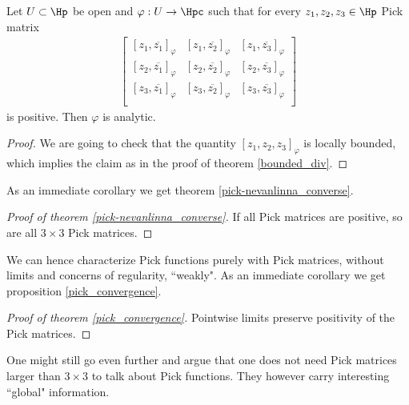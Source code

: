 \begin{lause}\label{Hindmarsh_theorem}
	Let $U \subset \Hp$ be open and $\varphi : U \to \Hpc$ such that for every $z_{1}, z_{2}, z_{3} \in \Hp$ Pick matrix
	\begin{align*}
	\begin{bmatrix}
		[z_{1}, \overline{z_{1}}]_{\varphi} & [z_{1}, \overline{z_{2}}]_{\varphi} & [z_{1}, \overline{z_{3}}]_{\varphi}\\
		[z_{2}, \overline{z_{1}}]_{\varphi} & [z_{2}, \overline{z_{2}}]_{\varphi} & [z_{2}, \overline{z_{3}}]_{\varphi}\\
		[z_{3}, \overline{z_{1}}]_{\varphi} & [z_{3}, \overline{z_{2}}]_{\varphi} & [z_{3}, \overline{z_{3}}]_{\varphi}\\
	\end{bmatrix}
	\end{align*}
	is positive. Then $\varphi$ is analytic.
\end{lause}
\begin{proof}
	We are going to check that the quantity $[z_{1}, z_{2}, z_{3}]_{\varphi}$ is locally bounded, which implies the claim as in the proof of theorem \ref{bounded_div}. 
\end{proof}

As an immediate corollary we get theorem \ref{pick-nevanlinna_converse}.

\begin{proof}[Proof of theorem \ref{pick-nevanlinna_converse}]
If all Pick matrices are positive, so are all $3 \times 3$ Pick matrices.
\end{proof}

We can hence characterize Pick functions purely with Pick matrices, without limits and concerns of regularity, ``weakly". As an immediate corollary we get proposition \ref{pick_convergence}.

\begin{proof}[Proof of theorem \ref{pick_convergence}]
Pointwise limits preserve positivity of the Pick matrices.
\end{proof}

One might still go even further and argue that one does not need Pick matrices larger than $3 \times 3$ to talk about Pick functions. They however carry interesting ``global" information.

